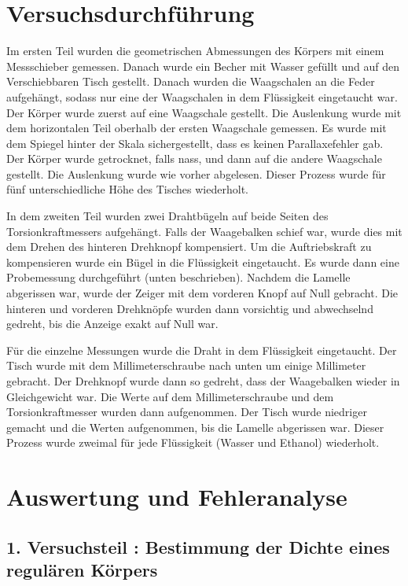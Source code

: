 \documentclass[11pt,a4paper]{article} %
\begin{document}
\newpage

\section{Versuchsdurchführung}
Im ersten Teil wurden die geometrischen Abmessungen des Körpers mit einem Messschieber gemessen. Danach wurde ein Becher mit Wasser gefüllt und auf den Verschiebbaren Tisch gestellt. Danach wurden die Waagschalen an die Feder aufgehängt, sodass nur eine der Waagschalen in dem Flüssigkeit eingetaucht war. Der Körper wurde zuerst auf eine Waagschale gestellt. Die Auslenkung wurde mit dem horizontalen Teil oberhalb der ersten Waagschale gemessen. Es wurde mit dem Spiegel hinter der Skala sichergestellt, dass es keinen Parallaxefehler gab. Der Körper wurde getrocknet, falls nass, und dann auf die andere Waagschale gestellt. Die Auslenkung wurde wie vorher abgelesen. Dieser Prozess wurde für fünf unterschiedliche Höhe des Tisches wiederholt.

In dem zweiten Teil wurden zwei Drahtbügeln auf beide Seiten des Torsionkraftmessers aufgehängt. Falls der Waagebalken schief war, wurde dies mit dem Drehen des hinteren Drehknopf kompensiert. Um die Auftriebskraft zu kompensieren wurde ein Bügel in die Flüssigkeit eingetaucht. Es wurde dann eine Probemessung durchgeführt (unten beschrieben). Nachdem die Lamelle abgerissen war, wurde der Zeiger mit dem vorderen Knopf auf Null gebracht. Die hinteren und vorderen Drehknöpfe wurden dann vorsichtig und abwechselnd gedreht, bis die Anzeige exakt auf Null war. 

Für die einzelne Messungen wurde die Draht in dem Flüssigkeit eingetaucht. Der Tisch wurde mit dem Millimeterschraube nach unten um einige Millimeter gebracht. Der Drehknopf wurde dann so gedreht, dass der Waagebalken wieder in Gleichgewicht war. Die Werte auf dem Millimeterschraube und dem Torsionkraftmesser wurden dann aufgenommen. Der Tisch wurde niedriger gemacht und die Werten aufgenommen, bis die Lamelle abgerissen war. Dieser Prozess wurde zweimal für jede Flüssigkeit (Wasser und Ethanol) wiederholt. 
\section{Auswertung und Fehleranalyse}

\subsection{1. Versuchsteil : Bestimmung der Dichte  eines regulären Körpers}
\end{document}
